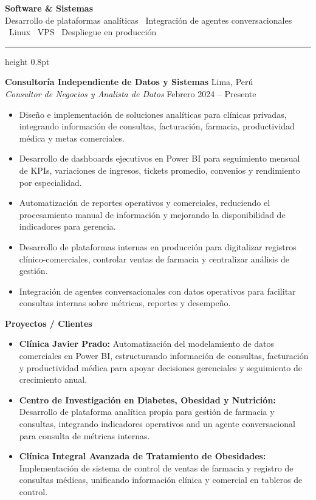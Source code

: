 \documentclass[11pt,a4paper]{article}
\newcommand{\mysection}[1]{%
    \vspace{0.3cm}
    \noindent{\large\bfseries\color{primary} #1}\par
    \vspace{0.1cm}
    {\color{primary}\hrule height 0.8pt}\par
    \vspace{0.2cm}
}
\newenvironment{myitemize}{
  \begin{itemize}
    \setlength{\itemsep}{2pt}
    \setlength{\parskip}{0pt}
    \setlength{\parsep}{0pt}
    \setlength{\topsep}{2pt}
}{
  \end{itemize}
}
\begin{document}
\vspace{0.2cm}
\noindent \textbf{Software \& Sistemas} \\
Desarrollo de plataformas analíticas \textperiodcentered\ Integración de agentes conversacionales \textperiodcentered\ Linux \textperiodcentered\ VPS \textperiodcentered\ Despliegue en producción

\mysection{Experiencia Profesional}

\noindent \textbf{Consultoría Independiente de Datos y Sistemas} \hfill Lima, Perú \\
\textit{Consultor de Negocios y Analista de Datos} \hfill Febrero 2024 -- Presente
\begin{myitemize}
    \item Diseño e implementación de soluciones analíticas para clínicas privadas, integrando información de consultas, facturación, farmacia, productividad médica y metas comerciales.
    \item Desarrollo de dashboards ejecutivos en Power BI para seguimiento mensual de KPIs, variaciones de ingresos, tickets promedio, convenios y rendimiento por especialidad.
    \item Automatización de reportes operativos y comerciales, reduciendo el procesamiento manual de información y mejorando la disponibilidad de indicadores para gerencia.
    \item Desarrollo de plataformas internas en producción para digitalizar registros clínico-comerciales, controlar ventas de farmacia y centralizar análisis de gestión.
    \item Integración de agentes conversacionales con datos operativos para facilitar consultas internas sobre métricas, reportes y desempeño.
\end{myitemize}

\vspace{0.2cm}
\noindent \textbf{Proyectos / Clientes}
\begin{myitemize}
    \item \textbf{Clínica Javier Prado:} Automatización del modelamiento de datos comerciales en Power BI, estructurando información de consultas, facturación y productividad médica para apoyar decisiones gerenciales y seguimiento de crecimiento anual.
    \item \textbf{Centro de Investigación en Diabetes, Obesidad y Nutrición:} Desarrollo de plataforma analítica propia para gestión de farmacia y consultas, integrando indicadores operativos and un agente conversacional para consulta de métricas internas.
    \item \textbf{Clínica Integral Avanzada de Tratamiento de Obesidades:} Implementación de sistema de control de ventas de farmacia y registro de consultas médicas, unificando información clínica y comercial en tableros de control.
\end{myitemize}
\end{document}
